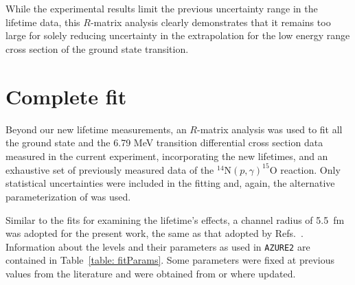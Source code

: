 While the experimental results limit the previous uncertainty range in the lifetime data, this $R$-matrix analysis clearly demonstrates that it remains too large for solely reducing uncertainty in the extrapolation for the low energy range cross section of the ground state transition.




\section{Complete fit}
\label{sec: complete fit}


Beyond our new lifetime measurements, an $R$-matrix analysis was used to fit all the ground state and the 6.79 MeV transition differential cross section data measured in the current experiment, incorporating the new lifetimes, and an exhaustive set of previously measured data of the $^{14}$N$(p,\gamma)^{15}$O reaction. Only statistical uncertainties were included in the fitting and, again, the alternative parameterization of \citet{PhysRevC.66.044611} was used.

Similar to the fits for examining the lifetime's effects, a channel radius of 5.5~fm was adopted for the present work, the same as that adopted by Refs.~\cite{Adelberger2011, Li2016, Wagner2018, Frentz2021}. Information about the levels and their parameters as used in \texttt{AZURE2} are contained in Table~\ref{table: fitParams}. Some parameters were fixed at previous values from the literature and were obtained from \citet{Ajzenberg-Selove1991} or \citet{Daigle2016} where updated.


